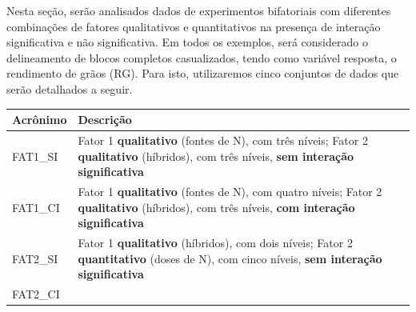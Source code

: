 \documentclass[
]{book}
\begin{document}
Nesta seção, serão analisados dados de experimentos bifatoriais com diferentes combinações de fatores qualitativos e quantitativos na presença de interação significativa e não significativa. Em todos os exemplos, será considerado o delineamento de blocos completos casualizados, tendo como variável resposta, o rendimento de grãos (RG). Para isto, utilizaremos cinco conjuntos de dados que serão detalhados a seguir.

\begin{longtable}[]{@{}ll@{}}
\toprule
\begin{minipage}[b]{0.10\columnwidth}\raggedright
Acrônimo\strut
\end{minipage} & \begin{minipage}[b]{0.84\columnwidth}\raggedright
Descrição \textbar{}\strut
\end{minipage}\tabularnewline
\midrule
\endhead
\begin{minipage}[t]{0.10\columnwidth}\raggedright
FAT1\_SI\strut
\end{minipage} & \begin{minipage}[t]{0.84\columnwidth}\raggedright
Fator 1 \textbf{qualitativo} (fontes de N), com três níveis; Fator 2 \textbf{qualitativo} (híbridos), com três níveis, \textbf{sem interação significativa}\strut
\end{minipage}\tabularnewline
\begin{minipage}[t]{0.10\columnwidth}\raggedright
FAT1\_CI\strut
\end{minipage} & \begin{minipage}[t]{0.84\columnwidth}\raggedright
Fator 1 \textbf{qualitativo} (fontes de N), com quatro níveis; Fator 2 \textbf{qualitativo} (híbridos), com três níveis, \textbf{com interação significativa}\strut
\end{minipage}\tabularnewline
\begin{minipage}[t]{0.10\columnwidth}\raggedright
FAT2\_SI\strut
\end{minipage} & \begin{minipage}[t]{0.84\columnwidth}\raggedright
Fator 1 \textbf{qualitativo} (híbridos), com dois níveis; Fator 2 \textbf{quantitativo} (doses de N), com cinco níveis, \textbf{sem interação significativa}\strut
\end{minipage}\tabularnewline
\begin{minipage}[t]{0.10\columnwidth}\raggedright
FAT2\_CI\strut
\end{minipage} & \begin{minipage}[t]{0.84\columnwidth}\raggedright

\end{minipage}
\end{longtable}
\end{document}
